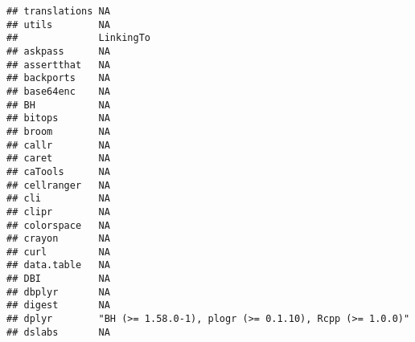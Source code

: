\documentclass[]{article}
\begin{document}
\begin{verbatim}
## translations NA                                                                                                                                                                                                                                                                                                                                                                                                                                                                                    
## utils        NA                                                                                                                                                                                                                                                                                                                                                                                                                                                                                    
##              LinkingTo                                             
## askpass      NA                                                    
## assertthat   NA                                                    
## backports    NA                                                    
## base64enc    NA                                                    
## BH           NA                                                    
## bitops       NA                                                    
## broom        NA                                                    
## callr        NA                                                    
## caret        NA                                                    
## caTools      NA                                                    
## cellranger   NA                                                    
## cli          NA                                                    
## clipr        NA                                                    
## colorspace   NA                                                    
## crayon       NA                                                    
## curl         NA                                                    
## data.table   NA                                                    
## DBI          NA                                                    
## dbplyr       NA                                                    
## digest       NA                                                    
## dplyr        "BH (>= 1.58.0-1), plogr (>= 0.1.10), Rcpp (>= 1.0.0)"
## dslabs       NA                                                    

\end{verbatim}
\end{document}
